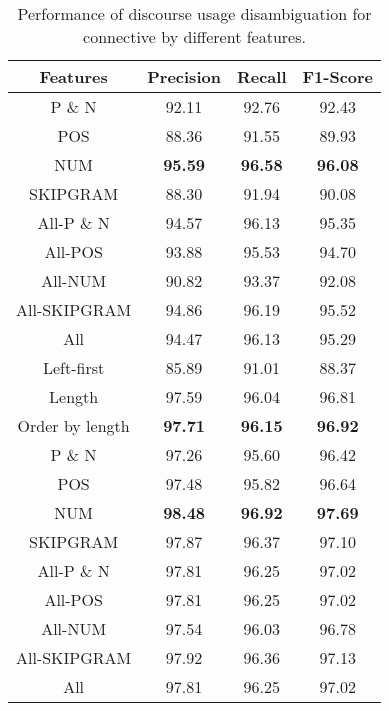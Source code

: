 \begin{table}[h]
\centering
\begin{tabular}{|c|c|c|c|}
\hline

\bf Features            & \bf Precision & \bf Recall & \bf F1-Score \\ \hline
    P \& N              &     92.11     &     92.76  &     92.43    \\ \hline
    POS                 &     88.36     &     91.55  &     89.93    \\ \hline
    NUM                 & \bf 95.59     & \bf 96.58  & \bf 96.08    \\ \hline
    SKIPGRAM            &     88.30     &     91.94  &     90.08    \\ \hline
    All-P \& N          &     94.57     &     96.13  &     95.35    \\ \hline
    All-POS             &     93.88     &     95.53  &     94.70    \\ \hline
    All-NUM             &     90.82     &     93.37  &     92.08    \\ \hline
    All-SKIPGRAM        &     94.86     &     96.19  &     95.52    \\ \hline
    All                 &     94.47     &     96.13  &     95.29    \\

\hhline{|=|=|=|=|}

    Left-first          &     85.89     &     91.01  &     88.37    \\ \hline
    Length              &     97.59     &     96.04  &     96.81    \\ \hline
    Order by length     & \bf 97.71     & \bf 96.15  & \bf 96.92    \\

\hhline{|=|=|=|=|}

    P \& N              &     97.26     &     95.60  &     96.42    \\ \hline
    POS                 &     97.48     &     95.82  &     96.64    \\ \hline
    NUM                 & \bf 98.48     & \bf 96.92  & \bf 97.69    \\ \hline
    SKIPGRAM            &     97.87     &     96.37  &     97.10    \\ \hline
    All-P \& N          &     97.81     &     96.25  &     97.02    \\ \hline
    All-POS             &     97.81     &     96.25  &     97.02    \\ \hline
    All-NUM             &     97.54     &     96.03  &     96.78    \\ \hline
    All-SKIPGRAM        &     97.92     &     96.36  &     97.13    \\ \hline
    All                 &     97.81     &     96.25  &     97.02    \\


\end{tabular}
\caption{\label{t:perfect-features} Performance of discourse usage
disambiguation for connective by different features. }
\end{table}
